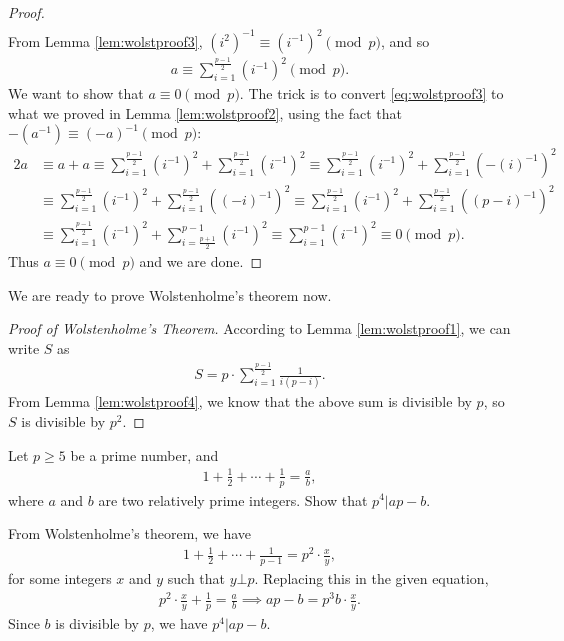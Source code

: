 \documentclass[12pt]{subfile}
\begin{document}
\begin{proof}
\begin{align*}
				\end{align*}
			From Lemma \ref{lem:wolstproof3},  $(i^2)^{-1} \equiv (i^{-1})^{2} \pmod p$, and so
				\begin{align}\label{eq:wolstproof3}
					a \equiv \sum_{i=1}^{\frac{p-1}{2}} (i^{-1})^{2} \pmod p.
				\end{align}
			We want to show that $a \equiv 0 \pmod p$. The trick is to convert \eqref{eq:wolstproof3} to what we proved in Lemma \ref{lem:wolstproof2}, using the fact that $-(a^{-1}) \equiv (-a)^{-1} \pmod p$:
				\begin{align*}
					2a &\equiv a+a \equiv \sum_{i=1}^{\frac{p-1}{2}} (i^{-1})^{2} + \sum_{i=1}^{\frac{p-1}{2}} (i^{-1})^{2} \equiv \sum_{i=1}^{\frac{p-1}{2}} (i^{-1})^{2} + \sum_{i=1}^{\frac{p-1}{2}} (-(i)^{-1})^{2}  \\
					&\equiv \sum_{i=1}^{\frac{p-1}{2}} (i^{-1})^{2} + \sum_{i=1}^{\frac{p-1}{2}} ((-i)^{-1})^{2}\equiv \sum_{i=1}^{\frac{p-1}{2}} (i^{-1})^{2} + \sum_{i=1}^{\frac{p-1}{2}} ((p-i)^{-1})^{2}\\
					& \equiv \sum_{i=1}^{\frac{p-1}{2}} (i^{-1})^{2} + \sum_{i=\frac{p+1}{2}}^{p-1} (i^{-1})^{2} \equiv \sum_{i=1}^{p-1} (i^{-1})^{2} \equiv 0 \pmod p.
				\end{align*}
			Thus $a \equiv 0 \pmod p$ and we are done.
		\end{proof}
	We are ready to prove Wolstenholme's theorem now.
		\begin{proof}[Proof of Wolstenholme's Theorem]
			According to Lemma \ref{lem:wolstproof1}, we can write $S$ as
			\begin{align*}
				S= p \cdot \sum_{i=1}^{\frac{p-1}{2}} \frac{1}{i(p-i)}.
			\end{align*}
			From Lemma \ref{lem:wolstproof4}, we know that the above sum is divisible by $p$, so $S$ is divisible by $p^2$.
		\end{proof}
		
		\begin{problem}
			Let $p \geq 5$ be a prime number, and 
			\begin{align*}
			1 + \frac{1}{2} + \cdots + \frac{1}{p}=\frac{a}{b},
			\end{align*}
			where $a$ and $b$ are two relatively prime integers. Show that $p^4 | ap -b$.
		\end{problem}
		
		\begin{solution}
			From Wolstenholme's theorem, we have
				\begin{align*}
				1 + \frac{1}{2} + \cdots + \frac{1}{p-1}=p^2 \cdot \frac{x}{y},
				\end{align*}
			for some integers $x$ and $y$ such that $y \bot p$. Replacing this in the given equation,
				\begin{align*}
				p^2 \cdot \frac{x}{y}+ \frac{1}{p}=\frac{a}{b} \implies ap-b = p^3b \cdot \frac{x}{y}.
				\end{align*}
			Since $b$ is divisible by $p$, we have $p^4 | ap-b$.
			
		\end{solution}
	
\end{document}
